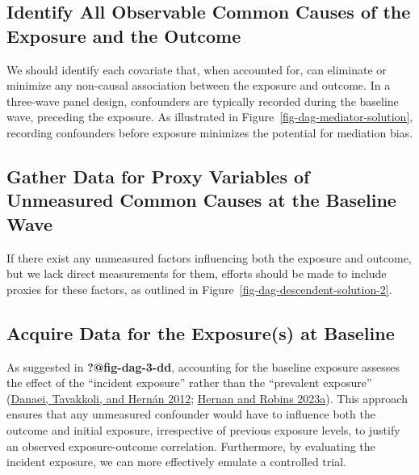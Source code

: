 \documentclass[
  singlecolumn]{report}
\begin{document}
\hypertarget{identify-all-observable-common-causes-of-the-exposure-and-the-outcome}{%
\subsection{\texorpdfstring{\textbf{Identify All Observable Common
Causes of the Exposure and the
Outcome}}{Identify All Observable Common Causes of the Exposure and the Outcome}}\label{identify-all-observable-common-causes-of-the-exposure-and-the-outcome}}

We should identify each covariate that, when accounted for, can
eliminate or minimize any non-causal association between the exposure
and outcome. In a three-wave panel design, confounders are typically
recorded during the baseline wave, preceding the exposure. As
illustrated in Figure~\ref{fig-dag-mediator-solution}, recording
confounders before exposure minimizes the potential for mediation bias.

\hypertarget{gather-data-for-proxy-variables-of-unmeasured-common-causes-at-the-baseline-wave}{%
\subsection{\texorpdfstring{\textbf{Gather Data for Proxy Variables of
Unmeasured Common Causes at the Baseline
Wave}}{Gather Data for Proxy Variables of Unmeasured Common Causes at the Baseline Wave}}\label{gather-data-for-proxy-variables-of-unmeasured-common-causes-at-the-baseline-wave}}

If there exist any unmeasured factors influencing both the exposure and
outcome, but we lack direct measurements for them, efforts should be
made to include proxies for these factors, as outlined in
Figure~\ref{fig-dag-descendent-solution-2}.

\hypertarget{acquire-data-for-the-exposures-at-baseline}{%
\subsection{\texorpdfstring{\textbf{Acquire Data for the Exposure(s) at
Baseline}}{Acquire Data for the Exposure(s) at Baseline}}\label{acquire-data-for-the-exposures-at-baseline}}

As suggested in \textbf{?@fig-dag-3-dd}, accounting for the baseline
exposure assesses the effect of the ``incident exposure'' rather than
the ``prevalent exposure'' (\protect\hyperlink{ref-danaei2012}{Danaei,
Tavakkoli, and Hernán 2012}; \protect\hyperlink{ref-hernan2023}{Hernan
and Robins 2023a}). This approach ensures that any unmeasured confounder
would have to influence both the outcome and initial exposure,
irrespective of previous exposure levels, to justify an observed
exposure-outcome correlation. Furthermore, by evaluating the incident
exposure, we can more effectively emulate a controlled trial.
\end{document}
